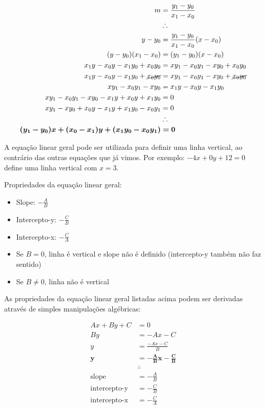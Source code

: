 \documentclass[pdftex, brazil, 12pt, twoside]{article}
\begin{document}
\begin{equation}
  \begin{split}
    m & = \frac{y_1 - y_0}{x_1 - x_0}\\
      & \therefore\\
    y - y_0 & = \frac{y_1 - y_0}{x_1 - x_0}(x - x_0)\\
    (y - y_0)(x_1 - x_0) & = (y_1 - y_0)(x - x_0)\\
    x_1y - x_0y - x_1y_0 + x_0y_0 & = xy_1 - x_0y_1 - xy_0 + x_0y_0\\
    x_1y - x_0y - x_1y_0 + \cancel{x_0y_0} & = xy_1 - x_0y_1 - xy_0 + \cancel{x_0y_0}\\
    xy_1 - x_0y_1 - xy_0 & = x_1y - x_0y - x_1y_0\\
    xy_1 - x_0y_1 - xy_0 - x_1y + x_0y + x_1y_0 & = 0\\
    xy_1 - xy_0 + x_0y - x_1y + x_1y_0 - x_0y_1 & = 0\\
    & \therefore\\
    \bm{(y_1 - y_0)x + (x_0 - x_1)y + (x_1y_0 - x_0y_1)} &\bm{= 0}
  \end{split}
\end{equation}

A equação linear geral pode ser utilizada para definir uma linha vertical, ao contrário
das outras equações que já vimos. Por exemplo: $-4x + 0y + 12 = 0$ define uma linha vertical
com $x = 3$.

Propriedades da equação linear geral:

\begin{itemize}
\item Slope: $-\frac{A}{B}$
\item Intercepto-y: $-\frac{C}{B}$
\item Intercepto-x: $-\frac{C}{A}$
\item Se $B = 0$, linha é vertical e slope não é definido (intercepto-y também não faz sentido)
\item Se $B \neq 0$, linha não é vertical
\end{itemize}

As propriedades da equação linear geral listadas acima podem ser derivadas através de
simples manipulações algébricas:

\begin{equation}
  \begin{split}
    Ax + By + C & = 0\\
    By & = -Ax -C\\
    y & = \frac{-Ax -C}{B}\\
    \bm{y} & \bm{= -\frac{A}{B}x -\frac{C}{B}}\\
    & \therefore\\
    \text{slope} & = -\frac{A}{B}\\
    \text{intercepto-y} & = -\frac{C}{B}\\
    \text{intercepto-x} & = -\frac{C}{A}
  \end{split}
\end{equation}
\end{document}
